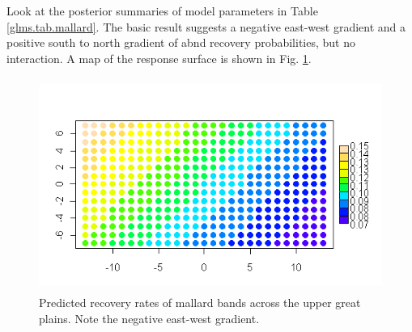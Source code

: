 


Look at the posterior summaries of model parameters in Table \ref{glms.tab.mallard}. The basic result suggests a negative east-west gradient and a positive
south to north gradient of abnd recovery probabilities, but no interaction. A map of the response
surface is shown in Fig. \ref{glms.fig.bandrecovery}.


\begin{figure}
\begin{center}
\includegraphics[height=2.75in]{Ch2/figs/responsesurface}
\end{center}
\caption{Predicted recovery rates of mallard bands across the upper great plains. Note the negative east-west gradient.}
\label{glms.fig.bandrecovery}
\end{figure}


